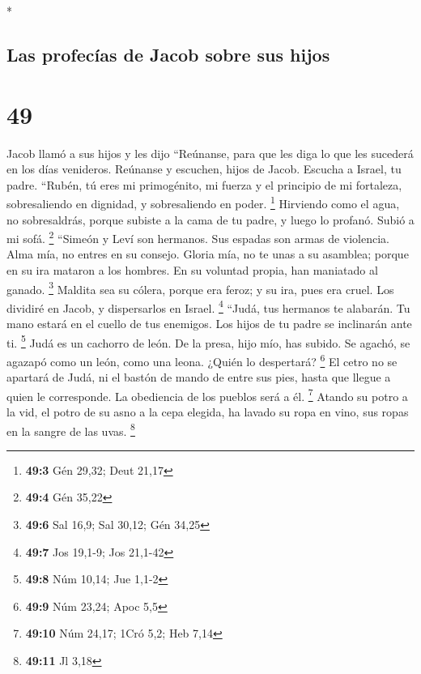 \begin{paracol}{2}
\begin{otherlanguage}{english}
\end{otherlanguage}

\switchcolumn[0]*

\hypertarget{las-profecuxedas-de-jacob-sobre-sus-hijos}{%
\subsection{Las profecías de Jacob sobre sus
hijos}\label{las-profecuxedas-de-jacob-sobre-sus-hijos}}

\hypertarget{section-96}{%
\section{49}\label{section-96}}

 Jacob llamó a sus hijos y les dijo ``Reúnanse, para que
les diga lo que les sucederá en los días venideros. 
Reúnanse y escuchen, hijos de Jacob. Escucha a Israel, tu padre.
 ``Rubén, tú eres mi primogénito, mi fuerza y el principio
de mi fortaleza, sobresaliendo en dignidad, y sobresaliendo en poder.
\footnote{\textbf{49:3} Gén 29,32; Deut 21,17}  Hirviendo
como el agua, no sobresaldrás, porque subiste a la cama de tu padre, y
luego lo profanó. Subió a mi sofá. \footnote{\textbf{49:4} Gén 35,22}
 ``Simeón y Leví son hermanos. Sus espadas son armas de
violencia.  Alma mía, no entres en su consejo. Gloria mía,
no te unas a su asamblea; porque en su ira mataron a los hombres. En su
voluntad propia, han maniatado al ganado. \footnote{\textbf{49:6} Sal
  16,9; Sal 30,12; Gén 34,25}  Maldita sea su cólera,
porque era feroz; y su ira, pues era cruel. Los dividiré en Jacob, y
dispersarlos en Israel. \footnote{\textbf{49:7} Jos 19,1-9; Jos 21,1-42}
 ``Judá, tus hermanos te alabarán. Tu mano estará en el
cuello de tus enemigos. Los hijos de tu padre se inclinarán ante ti.
\footnote{\textbf{49:8} Núm 10,14; Jue 1,1-2}  Judá es un
cachorro de león. De la presa, hijo mío, has subido. Se agachó, se
agazapó como un león, como una leona. ¿Quién lo despertará? \footnote{\textbf{49:9}
  Núm 23,24; Apoc 5,5}  El cetro no se apartará de Judá,
ni el bastón de mando de entre sus pies, hasta que llegue a quien le
corresponde. La obediencia de los pueblos será a él. \footnote{\textbf{49:10}
  Núm 24,17; 1Cró 5,2; Heb 7,14}  Atando su potro a la
vid, el potro de su asno a la cepa elegida, ha lavado su ropa en vino,
sus ropas en la sangre de las uvas. \footnote{\textbf{49:11} Jl 3,18}

\end{paracol}
